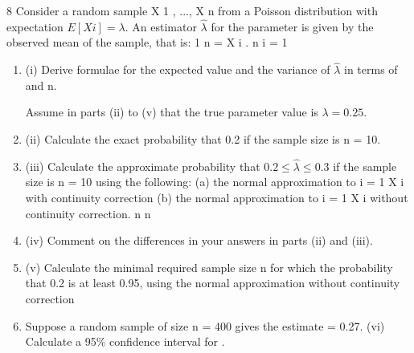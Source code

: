 \documentclass[a4paper,12pt]{article}
\begin{document}
8
Consider a random sample X 1 , ..., X n from a Poisson distribution with expectation $E[X i ] = \lambda$. An estimator $\hat{\lambda}$ for the parameter \lambda is given by the observed mean of the sample, that is:
1 n
\hat{\lambda} = \sum X i .
n i = 1
\begin{enumerate}
    \item (i)
Derive formulae for the expected value and the variance of $\hat{\lambda}$  in terms of \lambda and n.

Assume in parts (ii) to (v) that the true parameter value is $\lambda = 0.25$.
\item (ii) Calculate the exact probability that 0.2 \leq \hat{\lambda}  if the sample size is n = 10.

\item (iii) Calculate the approximate probability that $0.2 \leq \hat{\lambda} \leq 0.3$ if the sample size is
n = 10 using the following:
(a) the normal approximation to \sum i = 1 X i with continuity correction
(b) the normal approximation to \sum i = 1 X i without continuity correction.
n
n
\item 
(iv) Comment on the differences in your answers in parts (ii) and (iii).

\item 
(v) Calculate the minimal required sample size n for which the probability that 0.2 \leq \hat{\lambda}  is at least 0.95, using the normal approximation without continuity correction

\item 
Suppose a random sample of size n = 400 gives the estimate \hat{\lambda} = 0.27.
(vi)
Calculate a 95\% confidence interval for \lambda.
\end{enumerate}

\newpage
\end{document}
